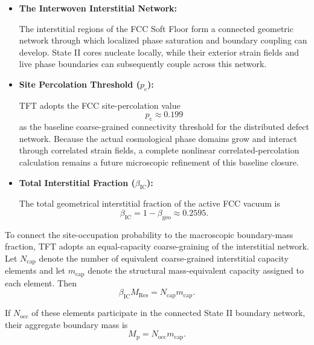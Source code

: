 \begin{itemize}

    \item \textbf{The Interwoven Interstitial Network:}

    The interstitial regions of the FCC Soft Floor form a connected geometric network through which localized phase saturation and boundary coupling can develop. State II cores nucleate locally, while their exterior strain fields and live phase boundaries can subsequently couple across this network.

    \item \textbf{Site Percolation Threshold ($p_{\mathrm{c}}$):}

    TFT adopts the FCC site-percolation value
    \begin{equation}
        p_{\mathrm{c}}
        \approx
        0.199
    \end{equation}
    as the baseline coarse-grained connectivity threshold for the distributed defect network. Because the actual cosmological phase domains grow and interact through correlated strain fields, a complete nonlinear correlated-percolation calculation remains a future microscopic refinement of this baseline closure.

    \item \textbf{Total Interstitial Fraction ($\beta_{\mathrm{IC}}$):}

    The total geometrical interstitial fraction of the active FCC vacuum is
    \begin{equation}
        \beta_{\mathrm{IC}}
        =
        1-\beta_{\mathrm{geo}}
        \approx
        0.2595.
    \end{equation}

\end{itemize}

To connect the site-occupation probability to the macroscopic boundary-mass fraction, TFT adopts an equal-capacity coarse-graining of the interstitial network. Let $N_{\mathrm{cap}}$ denote the number of equivalent coarse-grained interstitial capacity elements and let $m_{\mathrm{cap}}$ denote the structural mass-equivalent capacity assigned to each element. Then
\begin{equation}
    \beta_{\mathrm{IC}}M_{\mathrm{Res}}
    =
    N_{\mathrm{cap}}m_{\mathrm{cap}}.
\end{equation}

If $N_{\mathrm{occ}}$ of these elements participate in the connected State II boundary network, their aggregate boundary mass is
\begin{equation}
    M_{\mathrm{p}}
    =
    N_{\mathrm{occ}}m_{\mathrm{cap}}.
\end{equation}

